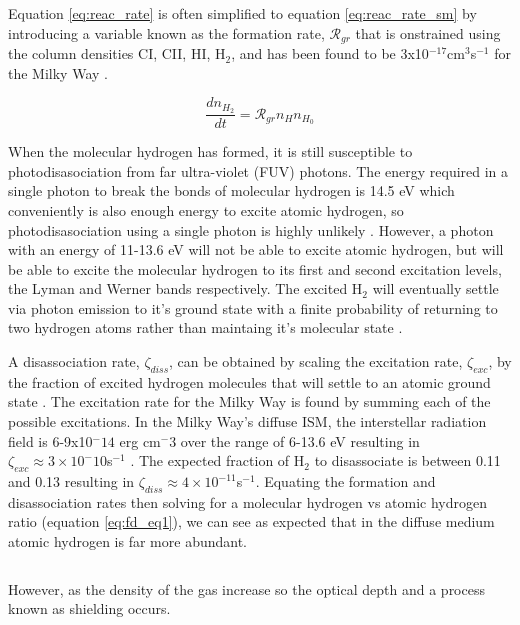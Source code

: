 Equation \ref{eq:reac_rate} is often simplified to equation \ref{eq:reac_rate_sm} by introducing a variable known as the formation rate, $\mathcal{R}_{gr}$ that is onstrained using the column densities CI, CII, HI, H$_2$, and has been found to be 3x10$^{-17}$cm$^3$s$^{-1}$ for the Milky Way \citep{jura1975, gry2002, wolfire2008}.

\begin{equation}\label{eq:reac_rate_sm}
  \frac{dn_{H_2}}{dt} = \mathcal{R}_{gr}n_H n_{H_0}
\end{equation}

When the molecular hydrogen has formed, it is still susceptible to photodisasociation from far ultra-violet (FUV) photons.  The energy required in a single photon to break the bonds of molecular hydrogen is 14.5 eV which conveniently is also enough energy to excite atomic hydrogen, so photodisasociation using a single photon is highly unlikely \citep{krumholz2014}.  However, a photon with an energy of 11-13.6 eV will not be able to excite atomic hydrogen, but will be able to excite the molecular hydrogen to its first and second excitation levels, the Lyman and Werner bands respectively.  The excited H$_2$ will eventually settle via photon emission to it's ground state with a finite probability of returning to two hydrogen atoms rather than maintaing it's molecular state \citep{krumholz2014}.

A disassociation rate, $\zeta_{diss}$, can be obtained by scaling the excitation rate, $\zeta_{exc}$, by the fraction of excited hydrogen molecules that will settle to an atomic ground state \citep{krumholz2014}.  The excitation rate for the Milky Way is found by summing each of the possible excitations.  In the Milky Way's diffuse ISM, the interstellar radiation field is 6-9x10$^-14$ erg cm$^-3$ over the range of 6-13.6 eV resulting in $\zeta_{exc} \approx 3\times10^-10$s$^{-1}$ \citep{draine2011}.  The expected fraction of H$_2$ to disassociate is between 0.11 and 0.13 resulting in $\zeta_{diss}\approx4\times10^{-11}$s$^{-1}$\citep{draine2011}.
Equating the formation and disassociation rates then solving for a molecular hydrogen vs atomic hydrogen ratio (equation \ref{eq:fd_eq1}), we can see as expected that in the diffuse medium atomic hydrogen is far more abundant.

\begin{equation}\label{eq:fd_eq1}

\end{equation}

However, as the density of the gas increase so the optical depth and a process known as shielding occurs.  

